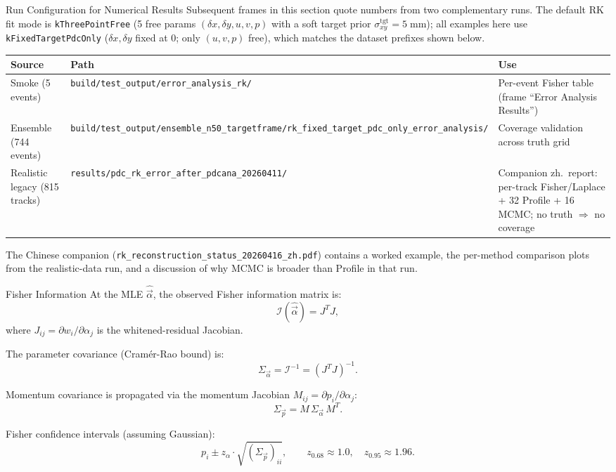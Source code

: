 \documentclass[aspectratio=169]{beamer}
\begin{document}
\begin{frame}{Run Configuration for Numerical Results}
\small
Subsequent frames in this section quote numbers from two complementary runs.
The default RK fit mode is \texttt{kThreePointFree} (5 free params $(\delta x, \delta y, u, v, p)$ with a soft target prior $\sigma_{xy}^\mathrm{tgt} = 5\;\mathrm{mm}$); all examples here use \texttt{kFixedTargetPdcOnly} ($\delta x, \delta y$ fixed at 0; only $(u, v, p)$ free), which matches the dataset prefixes shown below.

\vspace{0.15cm}
\begin{tabular}{@{}p{}p{}p{}@{}}
\toprule
Source & Path & Use \\
\midrule
Smoke (5 events) & \texttt{build/test\_output/error\_analysis\_rk/} & Per-event Fisher table (frame ``Error Analysis Results'') \\
Ensemble (744 events) & \texttt{build/test\_output/ensemble\_n50\_targetframe/rk\_fixed\_target\_pdc\_only\_error\_analysis/} & Coverage validation across truth grid \\
Realistic legacy (815 tracks) & \texttt{results/pdc\_rk\_error\_after\_pdcana\_20260411/} & Companion zh.\ report: per-track Fisher/Laplace + 32 Profile + 16 MCMC; no truth $\Rightarrow$ no coverage \\
\bottomrule
\end{tabular}

\vspace{0.15cm}
The Chinese companion (\texttt{rk\_reconstruction\_status\_20260416\_zh.pdf}) contains a worked example, the per-method comparison plots from the realistic-data run, and a discussion of why MCMC is broader than Profile in that run.
\end{frame}

\begin{frame}{Fisher Information}
\small
At the MLE $\hat{\vec{\alpha}}$, the observed Fisher information matrix is:
\[
\mathcal{I}(\hat{\vec{\alpha}}) = J^T J,
\]
where $J_{ij} = \partial w_i / \partial \alpha_j$ is the whitened-residual Jacobian.

The parameter covariance (Cram\'{e}r-Rao bound) is:
\[
\Sigma_{\vec{\alpha}} = \mathcal{I}^{-1} = (J^T J)^{-1}.
\]

Momentum covariance is propagated via the momentum Jacobian $M_{ij} = \partial p_i / \partial \alpha_j$:
\[
\Sigma_{\vec{p}} = M \, \Sigma_{\vec{\alpha}} \, M^T.
\]

Fisher confidence intervals (assuming Gaussian):
\[
p_i \pm z_\alpha \cdot \sqrt{(\Sigma_{\vec{p}})_{ii}}, \qquad z_{0.68} \approx 1.0,\quad z_{0.95} \approx 1.96.
\]
\end{frame}
\end{document}
